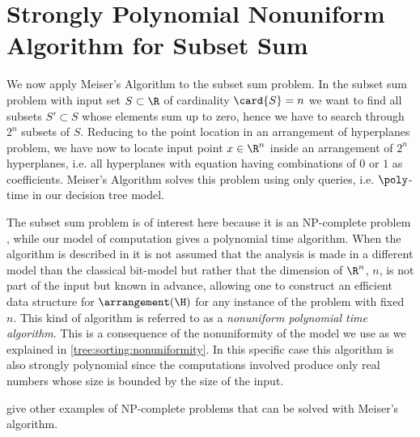 \section{Strongly Polynomial Nonuniform Algorithm for Subset Sum}

We now apply Meiser's Algorithm to the subset sum problem. In the subset sum
problem with input set $S \subset \R$ of cardinality $\card{S} = n$ we want to
find all subsets $S' \subset S$ whose elements sum up to zero, hence we have
to search through $2^n$ subsets of $S$. Reducing to the point location in an
arrangement of hyperplanes problem, we have now to locate input point $x \in
\R^n$ inside an arrangement of $2^n$ hyperplanes, i.e. all hyperplanes with
equation having combinations of $0$ or $1$ as coefficients. Meiser's Algorithm
solves this problem using only  queries, i.e. $\poly$-time
in our decision tree model.

The subset sum problem is of interest here because it is an NP-complete problem
\cite{karp:1972}, while our model of computation gives a polynomial time
algorithm. When the algorithm is described in \cite{burgisser:1997} it is not
assumed that the analysis is made in a different model than the classical
bit-model but rather that the dimension of $\R^n$, $n$, is not part of the input
but known in advance, allowing one to construct an efficient data structure for
$\arrangement(\H)$ for any instance of the problem with fixed $n$. This kind of
algorithm is referred to as a \emph{nonuniform polynomial time algorithm}.
This is a consequence of the nonuniformity of the model we use as we explained
in \ref{tree:sorting:nonuniformity}. In this specific case this algorithm is
also strongly polynomial since the computations involved produce only real
numbers whose size is bounded by the size of the input.

\citet*{meiser:1993,burgisser:1997} give other examples of
NP-complete problems that can be solved with Meiser's algorithm.
